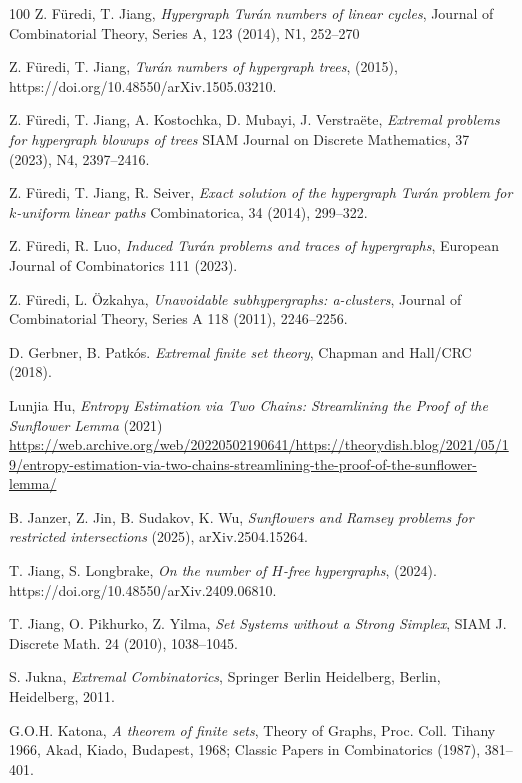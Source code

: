 \documentclass[graybox]{svmult}
\begin{document}
\begin{thebibliography}{100}
  Z. F\"uredi, T. Jiang, {\it Hypergraph Tur\'an numbers of linear cycles}, Journal of Combinatorial Theory, Series A, 123 (2014), N1, 252--270

 Z. F\"uredi, T. Jiang, {\it Tur\'an numbers of hypergraph trees}, (2015),     https://doi.org/10.48550/arXiv.1505.03210.

 Z. F\"uredi, T. Jiang, A. Kostochka, D. Mubayi, J. Verstra\"ete, {\it Extremal problems for hypergraph blowups of trees} SIAM Journal on Discrete Mathematics, 37 (2023), N4, 2397--2416.


 Z. F\"uredi, T. Jiang, R. Seiver, {\it Exact solution of the hypergraph Tur\'an problem for $k$-uniform linear paths} Combinatorica, 34 (2014), 299--322.

 Z. F\"uredi, R. Luo, {\it Induced Tur\'an problems and traces of hypergraphs}, European Journal of Combinatorics 111 (2023).


 Z. F\"uredi, L. \"Ozkahya, {\it Unavoidable subhypergraphs: a-clusters}, Journal of Combinatorial Theory, Series A 118 (2011), 2246--2256.

 D. Gerbner, B. Patk\'os. {\it Extremal finite set theory}, Chapman and Hall/CRC  (2018).

 Lunjia Hu, {\it Entropy Estimation via Two Chains: Streamlining the Proof of the Sunflower Lemma} (2021) \url{https://web.archive.org/web/20220502190641/https://theorydish.blog/2021/05/19/entropy-estimation-via-two-chains-streamlining-the-proof-of-the-sunflower-lemma/}

 B. Janzer, Z. Jin, B. Sudakov, K. Wu, {\it Sunflowers and Ramsey problems for restricted intersections} (2025), arXiv.2504.15264.


 T. Jiang, S. Longbrake, {\it On the number of $H$-free hypergraphs}, (2024). https://doi.org/10.48550/arXiv.2409.06810.


 T. Jiang, O. Pikhurko, Z. Yilma, {\it Set Systems without a Strong Simplex}, SIAM J. Discrete Math. 24 (2010), 1038--1045.



 S. Jukna, {\it Extremal Combinatorics}, Springer Berlin Heidelberg, Berlin, Heidelberg, 2011.

 G.O.H. Katona, {\it A theorem of finite sets}, Theory of Graphs, Proc. Coll. Tihany 1966, Akad,
Kiado, Budapest, 1968; Classic Papers in Combinatorics (1987), 381--401.


\end{thebibliography}
\end{document}
